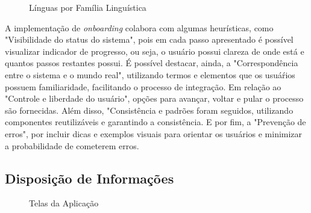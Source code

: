 \begin{figure}[h!]
	\centering
	\caption{Línguas por Família Linguística}
	\label{fig23}
\end{figure}

A implementação de \textit{onboarding} colabora com algumas heurísticas, como "Visibilidade do status do sistema", pois em cada passo apresentado é possível visualizar indicador de progresso, ou seja, 
o usuário possui clareza de onde está e quantos passos restantes possui. É possível destacar, ainda, a "Correspondência entre o sistema e o mundo real", utilizando termos e elementos que os usuáŕios 
possuem familiaridade, facilitando o processo de integração. Em relação ao "Controle e liberdade do usuário", opções para avançar, voltar e pular o processo são fornecidas. Além disso, "Consistência e 
padrões foram seguidos, utilizando componentes reutilizáveis e garantindo a consistência. E por fim, a "Prevenção de erros", por incluir dicas e exemplos visuais para orientar os usuários e  minimizar 
a probabilidade de cometerem erros.

\subsection{Disposição de Informações}
\label{sec:Disposição de Informações}

\begin{figure}[h!]
	\centering
	\caption{Telas da Aplicação}
	\label{fig24}
\end{figure}

